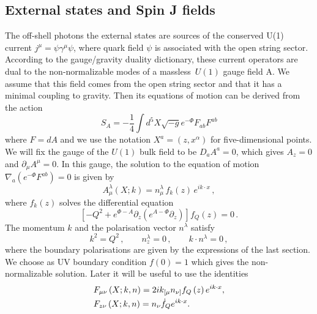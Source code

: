 \documentclass[preprint, 12pt]{elsarticle}
\begin{document}
\subsection{External states and Spin J fields}

The off-shell photons the external states are sources of the conserved U(1) current $j^\mu = \psi \gamma^\mu \psi$, where quark field $\psi$ is associated with the open string sector. According to the gauge/gravity duality dictionary, these current operators are dual to the non-normalizable modes of a massless~$U(1)$ gauge field A. We assume that this field comes from the open string sector and that it has a minimal coupling to gravity. Then its equations of motion can be derived from the action 
\begin{equation}
S_A = - \frac{1}{4} \int d^5 X \sqrt{-g} e^{- \Phi} F_{ab} F^{ab}
\end{equation}
where $F=dA$ and we use the notation $X^a=(z,x^\alpha)$ for five-dimensional points. 
We will fix the gauge of the $U(1)$ bulk field to be $D_a A^a = 0$, which gives  
$A_z = 0$ and $\partial_\mu A^\mu = 0$. In this gauge, the solution to the equation of motion 
$ \nabla_a \left( e^{-\Phi} F^{ab} \right)=0$ is given by
\begin{equation}
 A_\mu^\lambda \left( X ; k\right) =  n_\mu^\lambda \, f_k ( z )\,e^{i k \cdot x}\,,
\end{equation}
where $f_k(z)$ solves the differential equation
\begin{equation}
  \label{eq:u1 eom gauge fixed}
  \left[-Q^2+e^{\Phi-A}\partial_z\left(e^{A-\Phi}\partial_z \right) \right]f_Q(z)= 0 \,.
\end{equation}
The momentum  $k$ and the polarisation vector $n^\lambda$ satisfy
\begin{equation}
  k^2 = Q^2 \,, \qquad 
  n^\lambda_z = 0 \,, \qquad
   k \cdot n^\lambda = 0 \,,
\end{equation}
where the boundary polarisations are given by the expressions of the last section. 
We choose as UV boundary condition $f(0)=1$ which gives the non-normalizable solution.
Later it will be useful to use the identities
\begin{align}
&F_{\mu\nu}\left(X; k, n\right) = 2 i k_{[\mu}n_{\nu]} f_Q \left(z\right) e^{i k \cdot x}, \notag \\
&F_{z\nu} \left(X; k, n\right) = n_\nu \dot{f}_Q e^{i k \cdot x}.
\label{eq:F_expression}
\end{align}
\end{document}

